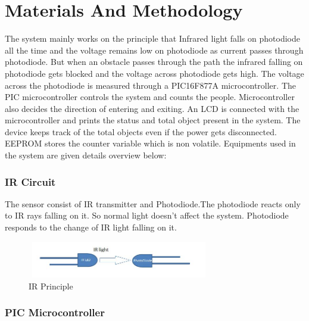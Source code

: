 \documentclass[conference]{IEEEtran}
\begin{document}
\hfill 
 
\section{Materials And Methodology}
The system mainly works on the principle  that Infrared light falls on photodiode all the time and the voltage remains low on photodiode as current passes through photodiode. But when an obstacle passes through the path the infrared falling on photodiode gets blocked and the voltage across photodiode gets high. The voltage across the photodiode is measured through a PIC16F877A microcontroller. The PIC microcontroller controls the system and counts the people. Microcontroller also decides the direction of entering and exiting. An LCD  is connected with the microcontroller and prints the status and total object present in the system. The device keeps track of the total objects even if the power gets disconnected. EEPROM stores the counter variable which is non volatile. Equipments used in the system are given details overview below:


\subsubsection{IR Circuit}
The sensor consist of IR transmitter and Photodiode.The photodiode reacts only to IR rays falling on it. So normal light doesn’t affect  the system. Photodiode responds to the change of IR light falling on it.
\begin{figure}[H]
  \includegraphics[width=8cm, height=1.6cm]{IR.jpg}
  \caption{IR Principle}
\centering
  \label{fig:IR}
\end{figure}


\subsubsection{PIC Microcontroller}
\end{document}
